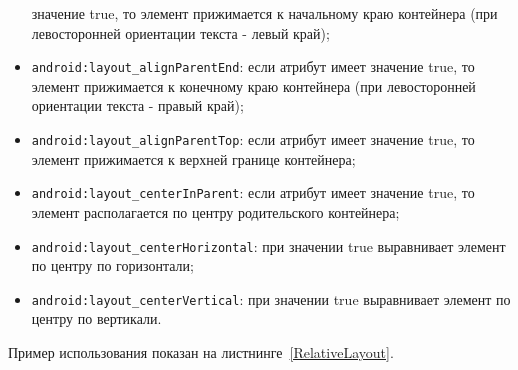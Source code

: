 \begin{itemize}
		значение true, то элемент прижимается к начальному краю контейнера
		(при левосторонней ориентации текста - левый край);
	\item \texttt{android:layout\_alignParentEnd}: если атрибут имеет значение
		true, то элемент прижимается к конечному краю контейнера
		(при левосторонней ориентации текста - правый край);
	\item \texttt{android:layout\_alignParentTop}: если атрибут имеет значение
		true, то элемент прижимается к верхней границе контейнера;
	\item \texttt{android:layout\_centerInParent}: если атрибут имеет значение
		true, то элемент располагается по центру родительского контейнера;
	\item \texttt{android:layout\_centerHorizontal}: при значении true
		выравнивает элемент по центру по горизонтали;
	\item \texttt{android:layout\_centerVertical}: при значении true
		выравнивает элемент по центру по вертикали.
\end{itemize}

Пример использования показан на листнинге~\ref{RelativeLayout}.

